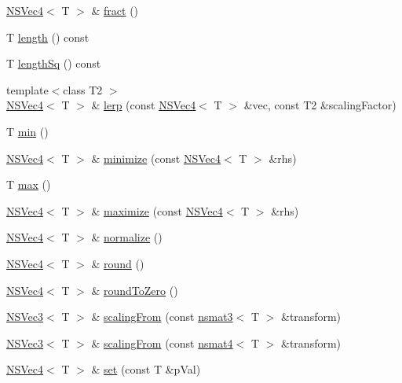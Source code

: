 \begin{DoxyCompactItemize}
\item 
\hyperlink{structNSVec4}{N\-S\-Vec4}$<$ T $>$ \& \hyperlink{structNSVec4_aa83bf545561187a592818cfe384897ac}{fract} ()
\item 
T \hyperlink{structNSVec4_ab9071e2c6ce76d94814bf196aedfdead}{length} () const 
\item 
T \hyperlink{structNSVec4_afae61afd86468807fdc942eca76537e6}{length\-Sq} () const 
\item 
{\footnotesize template$<$class T2 $>$ }\\\hyperlink{structNSVec4}{N\-S\-Vec4}$<$ T $>$ \& \hyperlink{structNSVec4_a13573a113bedaec636c9c9f5b4b58ef1}{lerp} (const \hyperlink{structNSVec4}{N\-S\-Vec4}$<$ T $>$ \&vec, const T2 \&scaling\-Factor)
\item 
T \hyperlink{structNSVec4_af251086273e4cb16df037b64781013a0}{min} ()
\item 
\hyperlink{structNSVec4}{N\-S\-Vec4}$<$ T $>$ \& \hyperlink{structNSVec4_af10548b222afde62d61112cab168d4b9}{minimize} (const \hyperlink{structNSVec4}{N\-S\-Vec4}$<$ T $>$ \&rhs)
\item 
T \hyperlink{structNSVec4_a7b2f3fa616dae2528d7fc345bcb1e311}{max} ()
\item 
\hyperlink{structNSVec4}{N\-S\-Vec4}$<$ T $>$ \& \hyperlink{structNSVec4_a323a7f359505866725658a6ab3b8d503}{maximize} (const \hyperlink{structNSVec4}{N\-S\-Vec4}$<$ T $>$ \&rhs)
\item 
\hyperlink{structNSVec4}{N\-S\-Vec4}$<$ T $>$ \& \hyperlink{structNSVec4_aa146f1f2761900d0cd2248718c8ff2ec}{normalize} ()
\item 
\hyperlink{structNSVec4}{N\-S\-Vec4}$<$ T $>$ \& \hyperlink{structNSVec4_aacaaad79d48125b6e263ae23b838039a}{round} ()
\item 
\hyperlink{structNSVec4}{N\-S\-Vec4}$<$ T $>$ \& \hyperlink{structNSVec4_a07b99eeab3cdb7dea12c76f5165615b2}{round\-To\-Zero} ()
\item 
\hyperlink{structNSVec3}{N\-S\-Vec3}$<$ T $>$ \& \hyperlink{structNSVec4_a7f8532160340afb376c66ea504fe40a6}{scaling\-From} (const \hyperlink{structnsmat3}{nsmat3}$<$ T $>$ \&transform)
\item 
\hyperlink{structNSVec3}{N\-S\-Vec3}$<$ T $>$ \& \hyperlink{structNSVec4_ab083a8efc52beb6c708dcb632d29f2d8}{scaling\-From} (const \hyperlink{structnsmat4}{nsmat4}$<$ T $>$ \&transform)
\item 
\hyperlink{structNSVec4}{N\-S\-Vec4}$<$ T $>$ \& \hyperlink{structNSVec4_ae5ef58acdaf7c42a300727347192f9a0}{set} (const T \&p\-Val)
\item 

\end{DoxyCompactItemize}

